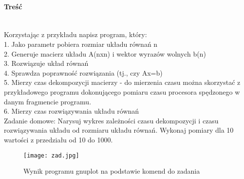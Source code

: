 \paragraph{Treść}~\\
Korzystając z przykładu napisz program, który:\\
1. Jako parametr pobiera rozmiar układu równań n\\
2. Generuje macierz układu A(nxn) i wektor wyrazów wolnych b(n)\\
3. Rozwiązuje układ równań\\
4. Sprawdza poprawność rozwiązania (tj., czy Ax=b)\\
5. Mierzy czas dekompozycji macierzy - do mierzenia czasu można skorzystać z przykładowego programu dokonującego pomiaru czasu procesora spędzonego w danym fragmencie programu.\\
6. Mierzy czas rozwiązywania układu równań\\
Zadanie domowe: Narysuj wykres zależności czasu dekompozycji i czasu rozwiązywania układu od rozmiaru układu równań. Wykonaj pomiary dla 10 wartości z przedziału od 10 do 1000.









\begin{figure}[p]
  \caption{Wynik programu gnuplot na podstawie komend do zadania}
  \label{fig:ZadJpg}
  \centering
  \texttt{[image: zad.jpg]}
\end{figure}
